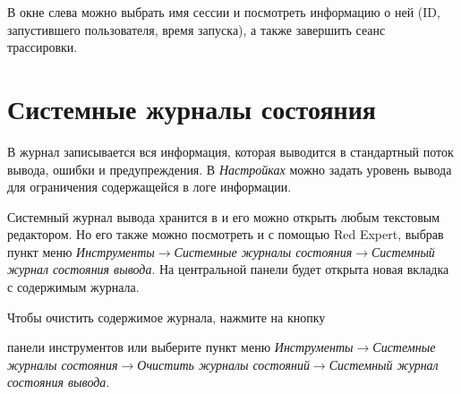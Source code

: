 В окне слева можно выбрать имя сессии и посмотреть информацию о ней (ID, запустившего пользователя, время запуска), а также завершить сеанс трассировки.

\newpage

\section{Системные журналы состояния}

\label{sec:logout}
В журнал записывается вся информация, которая выводится в стандартный поток вывода, ошибки и предупреждения. В \textit{Настройках} можно задать уровень вывода для ограничения содержащейся в логе информации.

Системный журнал вывода хранится в  и его можно открыть любым текстовым редактором. Но его также можно посмотреть и с помощью Red Expert, выбрав пункт меню  \textit{Инструменты}$\rightarrow$\textit{Системные журналы состояния}$\rightarrow$\textit{Системный журнал состояния вывода}. На центральной панели будет открыта новая вкладка с содержимым журнала.

Чтобы очистить содержимое журнала, нажмите на кнопку 
панели инструментов или выберите пункт меню \textit{Инструменты}$\rightarrow$\textit{Системные журналы состояния}$\rightarrow$\textit{Очистить журналы состояний}$\rightarrow$\textit{Системный журнал состояния вывода}.

\newpage


